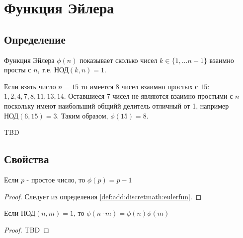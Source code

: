 \section{Функция Эйлера}

\subsection{Определение}
\begin{definition}
Функция Эйлера $\phi\left(n\right)$ показывает сколько чисел $k \in
\{1, ... n-1\}$ взаимно просты с $n$, т.е. $\mbox{НОД}\left(k,
n\right) = 1$.
\label{def:add:discretmath:eulerfun}
\end{definition}

\begin{example}
  Если взять число $n=15$ то имеется 8 чисел взаимно простых с $15$: 
  $1, 2, 4, 7, 8, 11, 13, 14$. Оставшиеся 7 чисел не являются взаимно
  простыми с $n$ поскольку имеют наибольший общийй делитель отличный
  от 1, например $\mbox{НОД}\left(6, 15\right) = 3$.
  Таким образом, $\phi\left(15\right) = 8$. 
\end{example}

\begin{remark}
\label{rem:add:discretmath:eulerfuncomplex}
TBD
\end{remark}

\subsection{Свойства}

\begin{property}
Если $p$ - простое число, то $\phi(p) = p - 1$
\begin{proof}
Следует из определения \ref{def:add:discretmath:eulerfun}.
\end{proof}
\label{prop:add:discretmath:eulerfun1}
\end{property}


\begin{property}
Если $\mbox{НОД}\left(n, m\right) = 1$, то
$\phi\left(n \cdot m\right) = \phi\left(n\right) \phi\left( m\right)$
\begin{proof}
TBD
\end{proof}
\label{prop:add:discretmath:eulerfun2}
\end{property}
